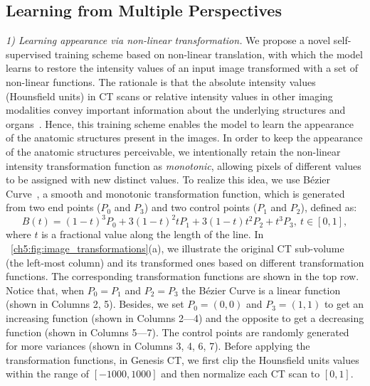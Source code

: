 \subsection{Learning from Multiple Perspectives}
\label{ch5:image_transformation}

\textit{1) Learning appearance via non-linear transformation.} We propose a novel self-supervised training scheme based on non-linear translation, with which the model learns to restore the intensity values of an input image transformed with a set of non-linear functions. The rationale is that the absolute intensity values (\ie Hounsfield units) in CT scans or relative intensity values in other imaging modalities convey important information about the underlying structures and organs~\citep{prince2006medical,buzug2011computed,forbes2012human}. Hence, this training scheme enables the model to learn the appearance of the anatomic structures present in the images. In order to keep the appearance of the anatomic structures perceivable, we intentionally retain the non-linear intensity transformation function as \textit{monotonic}, allowing pixels of different values to be assigned with new distinct values. To realize this idea, we use B{\'e}zier Curve~\citep{mortenson1999mathematics}, a smooth and monotonic transformation function, which is generated from two end points ($P_0$ and $P_3$) and two control points ($P_1$ and $P_2$), defined as:
\begin{equation}
    B(t)=(1-t)^3P_0+3(1-t)^2tP_1+3(1-t)t^2P_2+t^3P_3,\ t\in [0,1],
\end{equation}
where $t$ is a fractional value along the length of the line. In \figurename~\ref{ch5:fig:image_transformations}(a), we illustrate the original CT sub-volume (the left-most column) and its transformed ones based on different transformation functions. The corresponding transformation functions are shown in the top row. Notice that, when $P_0 = P_1$ and $P_2 = P_3$ the B{\'e}zier Curve is a linear function (shown in Columns 2, 5). Besides, we set $P_0 = (0,0)$ and $P_3 = (1,1)$ to get an increasing function (shown in Columns 2---4) and the opposite to get a decreasing function (shown in Columns 5---7). The control points are randomly generated for more variances (shown in Columns 3, 4, 6, 7). Before applying the transformation functions, in Genesis CT, we first clip the Hounsfield units values within the range of $[-1000, 1000]$ and then normalize each CT scan to $[0, 1]$.
     

